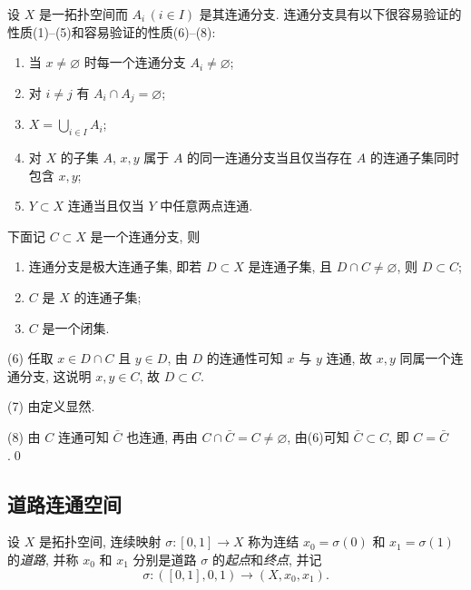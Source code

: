     \begin{Proposition}
        设 $ X $ 是一拓扑空间而 $ A_i\,(i\in I) $ 是其连通分支. 连通分支具有以下很容易验证的性质(1)--(5)和容易验证的性质(6)--(8): 
        \begin{enumerate}
            \item 当 $ x\ne\varnothing $ 时每一个连通分支 $ A_i\ne\varnothing $;
            \item 对 $ i\ne j $ 有 $ A_i\cap A_j=\varnothing $;
            \item $ X=\bigcup_{i\in I}A_i $;
            \item 对 $ X $ 的子集 $ A $, $ x,y $ 属于 $ A $ 的同一连通分支当且仅当存在 $ A $ 的连通子集同时包含 $ x,y $;
            \item $ Y\subset X $ 连通当且仅当 $ Y $ 中任意两点连通.
        \end{enumerate}
        下面记 $ C\subset X $ 是一个连通分支, 则
        \begin{enumerate}[start=6]
            \item 连通分支是极大连通子集, 即若 $ D\subset X $ 是连通子集, 且 $ D\cap C\ne\varnothing $, 则 $ D\subset C $;
            \item $ C $ 是 $ X $ 的连通子集;
            \item $ C $ 是一个闭集.
        \end{enumerate}
    \end{Proposition}
    \begin{Proof}
        (6) 任取 $ x\in D\cap C $ 且 $ y\in D $, 由 $ D $ 的连通性可知 $ x $ 与 $ y $ 连通, 故 $ x,y $ 同属一个连通分支, 这说明 $ x,y\in C $, 故 $ D\subset C $.

        (7) 由定义显然.

        (8) 由 $ C $ 连通可知 $ \bar{C} $ 也连通, 再由 $ C\cap\bar{C}=C\ne\varnothing $, 由(6)可知 $ \bar{C}\subset C $, 即 $ C=\bar{C} $.\qed
    \end{Proof}
    
\subsection{道路连通空间}

    \begin{Definition}[道路]
        设 $ X $ 是拓扑空间, 连续映射 $ \sigma : [0,1]\to X $ 称为连结 $ x_0=\sigma(0) $ 和 $ x_1=\sigma(1) $ 的\emph{道路}, 并称 $ x_0 $ 和 $ x_1 $ 分别是道路 $ \sigma $ 的\emph{起点}和\emph{终点}, 并记
        \[
            \sigma : ([0,1],0,1)\to(X,x_0,x_1).
        \]
    \end{Definition}

